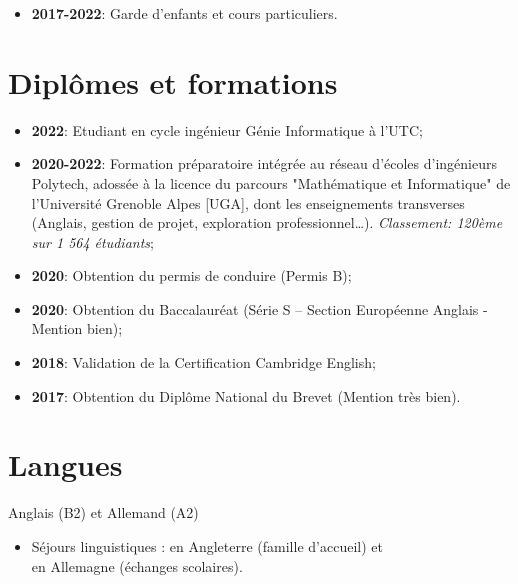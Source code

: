 \documentclass[10pt, oneside, a4paper, titlepage]{article}
\begin{document}
\begin{tcolorbox}
\begin{minipage}[t]{12cm}
\begin{tcolorbox}[grow to right by = 0.6cm, colback = gray!25, colframe = white]
\begin{itemize}
                    \item \textbf{2017-2022}: Garde d’enfants et cours particuliers.
                \end{itemize}

                \section*{Diplômes et formations }
                \begin{itemize}
                    \item \textbf{2022}: Etudiant en cycle ingénieur Génie Informatique à l'UTC;             
                    \item \textbf{2020-2022}: Formation préparatoire intégrée au réseau d’écoles d’ingénieurs Polytech, adossée à la licence du parcours "Mathématique et Informatique" de l’Université Grenoble Alpes [UGA], dont les enseignements transverses (Anglais, gestion de projet, exploration professionnel\ldots). \emph{Classement: 120ème sur 1 564 étudiants};
                    \item \textbf{2020}: Obtention du permis de conduire (Permis B);

                    \item \textbf{2020}: Obtention du Baccalauréat (Série S – Section Européenne Anglais - Mention bien);                  
                    \item \textbf{2018}: Validation de la Certification Cambridge English;
                    \item \textbf{2017}: Obtention du Diplôme National du Brevet (Mention très bien).
                \end{itemize}

                
                    \section*{Langues}
                    Anglais (B2) et Allemand (A2)
                    \begin{itemize}
                        \item Séjours linguistiques : en Angleterre (famille d’accueil) et \\en Allemagne (échanges scolaires).
                    \end{itemize}
                    \vspace*{0.1mm}


                
            \end{tcolorbox}
        \end{minipage}
    \end{tcolorbox}
\end{document}
